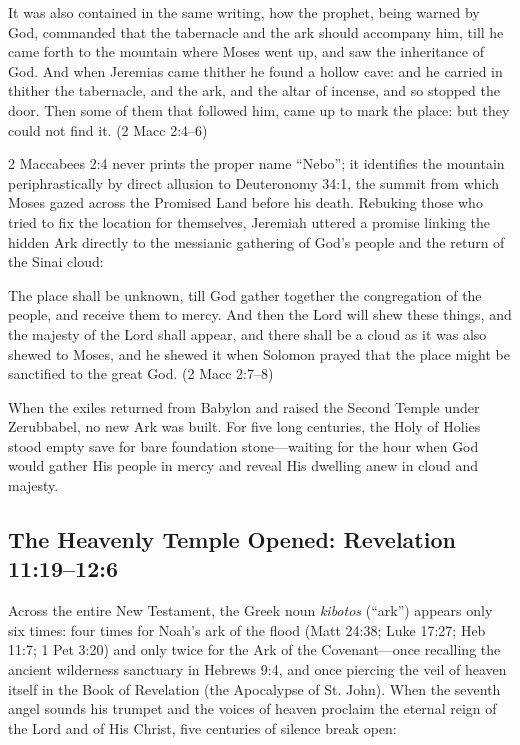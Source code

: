 \begin{scriptureblock}
It was also contained in the same writing, how the prophet, being warned by God, commanded that the tabernacle and the ark should accompany him, till he came forth to the mountain where Moses went up, and saw the inheritance of God. And when Jeremias came thither he found a hollow cave: and he carried in thither the tabernacle, and the ark, and the altar of incense, and so stopped the door. Then some of them that followed him, came up to mark the place: but they could not find it. \textnormal{(2 Macc 2:4--6)}
\end{scriptureblock}

2 Maccabees 2:4 never prints the proper name ``Nebo''; it identifies the mountain periphrastically by direct allusion to Deuteronomy 34:1, the summit from which Moses gazed across the Promised Land before his death. Rebuking those who tried to fix the location for themselves, Jeremiah uttered a promise linking the hidden Ark directly to the messianic gathering of God's people and the return of the Sinai cloud:

\begin{scriptureblock}
The place shall be unknown, till God gather together the congregation of the people, and receive them to mercy. And then the Lord will shew these things, and the majesty of the Lord shall appear, and there shall be a cloud as it was also shewed to Moses, and he shewed it when Solomon prayed that the place might be sanctified to the great God. \textnormal{(2 Macc 2:7--8)}
\end{scriptureblock}

When the exiles returned from Babylon and raised the Second Temple under Zerubbabel, no new Ark was built. For five long centuries, the Holy of Holies stood empty save for bare foundation stone---waiting for the hour when God would gather His people in mercy and reveal His dwelling anew in cloud and majesty.

\subsection{The Heavenly Temple Opened: Revelation 11:19--12:6}

Across the entire New Testament, the Greek noun \textit{kibotos} (``ark'') appears only six times: four times for Noah's ark of the flood (Matt 24:38; Luke 17:27; Heb 11:7; 1 Pet 3:20) and only twice for the Ark of the Covenant---once recalling the ancient wilderness sanctuary in Hebrews 9:4, and once piercing the veil of heaven itself in the Book of Revelation (the Apocalypse of St. John). When the seventh angel sounds his trumpet and the voices of heaven proclaim the eternal reign of the Lord and of His Christ, five centuries of silence break open:

